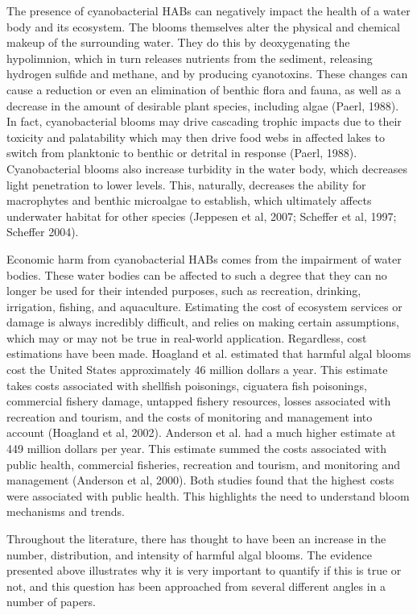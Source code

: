 \documentclass[11pt,]{article}
\begin{document}
The presence of cyanobacterial HABs can negatively impact the health of
a water body and its ecosystem. The blooms themselves alter the physical
and chemical makeup of the surrounding water. They do this by
deoxygenating the hypolimnion, which in turn releases nutrients from the
sediment, releasing hydrogen sulfide and methane, and by producing
cyanotoxins. These changes can cause a reduction or even an elimination
of benthic flora and fauna, as well as a decrease in the amount of
desirable plant species, including algae (Paerl, 1988). In fact,
cyanobacterial blooms may drive cascading trophic impacts due to their
toxicity and palatability which may then drive food webs in affected
lakes to switch from planktonic to benthic or detrital in response
(Paerl, 1988). Cyanobacterial blooms also increase turbidity in the
water body, which decreases light penetration to lower levels. This,
naturally, decreases the ability for macrophytes and benthic microalgae
to establish, which ultimately affects underwater habitat for other
species (Jeppesen et al, 2007; Scheffer et al, 1997; Scheffer 2004).

Economic harm from cyanobacterial HABs comes from the impairment of
water bodies. These water bodies can be affected to such a degree that
they can no longer be used for their intended purposes, such as
recreation, drinking, irrigation, fishing, and aquaculture. Estimating
the cost of ecosystem services or damage is always incredibly difficult,
and relies on making certain assumptions, which may or may not be true
in real-world application. Regardless, cost estimations have been made.
Hoagland et al. estimated that harmful algal blooms cost the United
States approximately 46 million dollars a year. This estimate takes
costs associated with shellfish poisonings, ciguatera fish poisonings,
commercial fishery damage, untapped fishery resources, losses associated
with recreation and tourism, and the costs of monitoring and management
into account (Hoagland et al, 2002). Anderson et al. had a much higher
estimate at 449 million dollars per year. This estimate summed the costs
associated with public health, commercial fisheries, recreation and
tourism, and monitoring and management (Anderson et al, 2000). Both
studies found that the highest costs were associated with public health.
This highlights the need to understand bloom mechanisms and trends.

Throughout the literature, there has thought to have been an increase in
the number, distribution, and intensity of harmful algal blooms. The
evidence presented above illustrates why it is very important to
quantify if this is true or not, and this question has been approached
from several different angles in a number of papers.
\end{document}
